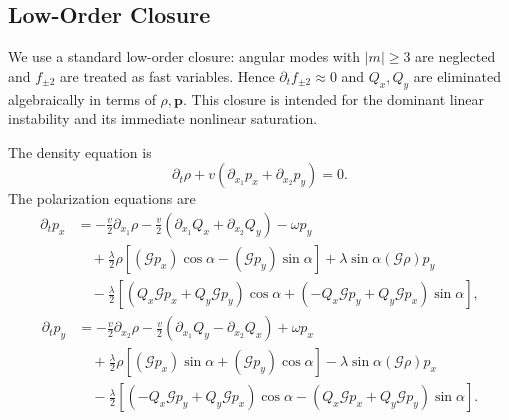 \documentclass[11pt]{article}
\numberwithin{equation}{section}
\begin{document}
\subsection{Low-Order Closure}

We use a standard low-order closure: angular modes with $|m|\ge3$ are
neglected and $f_{\pm2}$ are treated as fast variables. Hence
$\partial_t f_{\pm2}\approx0$ and $Q_x,Q_y$ are eliminated algebraically
in terms of $\rho,\mathbf p$. This closure is intended for the dominant
linear instability and its immediate nonlinear saturation.

The density equation is
\begin{equation}
  \partial_t\rho+v(\partial_{x_1}p_x+\partial_{x_2}p_y)=0.
  \label{eq:density_equation}
\end{equation}
The polarization equations are
\begin{align}
  \partial_t p_x
  &=
  -\frac{v}{2}\partial_{x_1}\rho
  -\frac{v}{2}(\partial_{x_1}Q_x+\partial_{x_2}Q_y)
  -\omega p_y \nonumber\\
  &\quad
  +\frac{\lambda}{2}\rho[
  (\mathcal Gp_x)\cos\alpha-(\mathcal Gp_y)\sin\alpha]
  +\lambda\sin\alpha(\mathcal G\rho)p_y \nonumber\\
  &\quad
  -\frac{\lambda}{2}
  \left[
  (Q_x\mathcal Gp_x+Q_y\mathcal Gp_y)\cos\alpha
  +(-Q_x\mathcal Gp_y+Q_y\mathcal Gp_x)\sin\alpha
  \right],
  \label{eq:px_equation}
\end{align}
\begin{align}
  \partial_t p_y
  &=
  -\frac{v}{2}\partial_{x_2}\rho
  -\frac{v}{2}(\partial_{x_1}Q_y-\partial_{x_2}Q_x)
  +\omega p_x \nonumber\\
  &\quad
  +\frac{\lambda}{2}\rho[
  (\mathcal Gp_x)\sin\alpha+(\mathcal Gp_y)\cos\alpha]
  -\lambda\sin\alpha(\mathcal G\rho)p_x \nonumber\\
  &\quad
  -\frac{\lambda}{2}
  \left[
  (-Q_x\mathcal Gp_y+Q_y\mathcal Gp_x)\cos\alpha
  -(Q_x\mathcal Gp_x+Q_y\mathcal Gp_y)\sin\alpha
  \right].
  \label{eq:py_equation}
\end{align}
\end{document}
